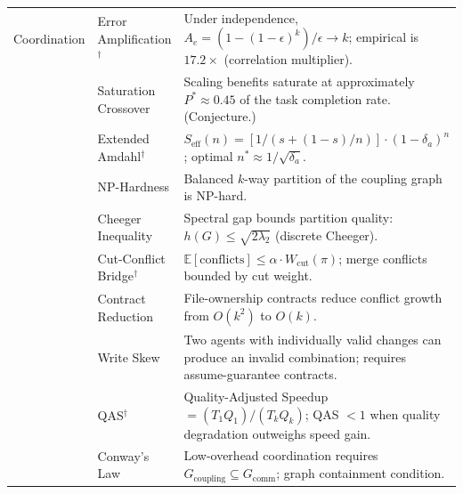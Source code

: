 \documentclass[11pt, a4paper]{googledeepmind}
\begin{document}
\begin{appendices}
\begin{longtable}{p{1.6cm}p{3.2cm}p{7.8cm}}
\midrule

Coordination
    & Error Amplification$^\dagger$ & Under independence, $A_e = (1-(1-\epsilon)^k)/\epsilon \to k$; empirical is $17.2\times$ (correlation multiplier). \\
    & Saturation Crossover & Scaling benefits saturate at approximately $P^* \approx 0.45$ of the task completion rate. (Conjecture.) \\
    & Extended Amdahl$^\dagger$ & $S_{\text{eff}}(n) = [1/(s+(1-s)/n)] \cdot (1-\delta_a)^n$; optimal $n^* \approx 1/\sqrt{\delta_a}$. \\
    & NP-Hardness & Balanced $k$-way partition of the coupling graph is NP-hard. \\
    & Cheeger Inequality & Spectral gap bounds partition quality: $h(G) \leq \sqrt{2\lambda_2}$ (discrete Cheeger). \\
    & Cut-Conflict Bridge$^\dagger$ & $\mathbb{E}[\text{conflicts}] \leq \alpha \cdot W_{\text{cut}}(\pi)$; merge conflicts bounded by cut weight. \\
    & Contract Reduction & File-ownership contracts reduce conflict growth from $O(k^2)$ to $O(k)$. \\
    & Write Skew & Two agents with individually valid changes can produce an invalid combination; requires assume-guarantee contracts. \\
    & QAS$^\dagger$ & Quality-Adjusted Speedup $= (T_1 Q_1)/(T_k Q_k)$; QAS $< 1$ when quality degradation outweighs speed gain. \\
    & Conway's Law & Low-overhead coordination requires $G_{\text{coupling}} \subseteq G_{\text{comm}}$; graph containment condition. \\

\midrule


\end{longtable}
\end{appendices}
\end{document}
